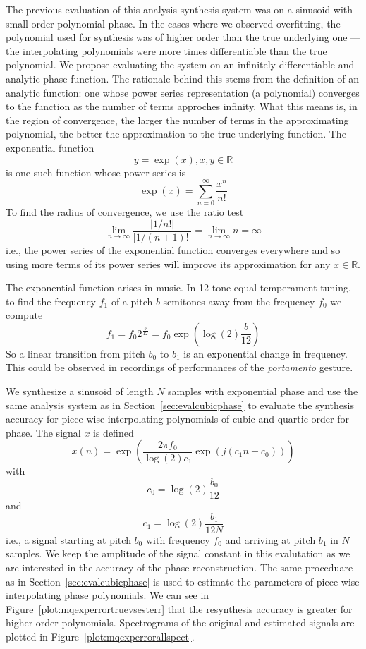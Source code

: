 The previous evaluation of this analysis-synthesis system was on a sinusoid with
small order polynomial phase. In the cases where we observed overfitting, the
polynomial used for synthesis was of higher order than the true underlying one
--- the interpolating polynomials were more times differentiable than the true
polynomial. We propose evaluating the system on an infinitely differentiable and
analytic phase function. The rationale behind this stems from the definition of
an analytic function: one whose power series representation (a polynomial)
converges to the function as the number of terms approches infinity. What this
means is, in the region of convergence, the larger the number of terms in the
approximating polynomial, the better the approximation to the true underlying
function. The exponential function
\[
    y=\exp(x), x,y \in \mathbb{R}
\]
is one such function whose power series is
\[
    \exp(x)=\sum_{n=0}^{\infty} \frac{x^{n}}{n!}
\]
To find the radius of convergence, we use the ratio test
\[
    \lim_{n \rightarrow \infty} \frac{|1/n!|}{|1/(n+1)!|} = \lim_{n \rightarrow \infty} n = \infty
\]
i.e., the power series of the exponential function converges everywhere and so
using more terms of its power series will improve its approximation for
any $x \in \mathbb{R}$.

The exponential function arises in music. In 12-tone equal temperament tuning,
to find the frequency $f_{1}$ of a pitch $b$-semitones away from the frequency
$f_{0}$ we compute
\[
    f_{1}=f_{0}2^{\frac{b}{12}}=f_{0}\exp(\log(2)\frac{b}{12})
\]
So a linear transition from pitch $b_{0}$ to $b_{1}$ is an exponential change in
frequency. This could be observed in recordings of performances of the
\textit{portamento} gesture.

We synthesize a sinusoid  of length $N$ samples with exponential phase and use
the same analysis system as in Section~\ref{sec:evalcubicphase} to evaluate the
synthesis accuracy for piece-wise interpolating polynomials of cubic and quartic
order for phase. The signal $x$ is defined
\[
    x(n) = \exp(\frac{2\pi f_{0}}{\log(2)c_{1}}\exp(j(c_{1}n + c_{0})))
\]
with
\[
    c_{0} = \log(2)\frac{b_{0}}{12}
\]
and
\[
    c_{1}= \log(2)\frac{b_{1}}{12N}
\]
i.e., a signal starting at pitch $b_{0}$ with frequency $f_{0}$ and arriving at
pitch $b_{1}$ in $N$ samples. We keep the amplitude of the signal constant in
this evalutation as we are interested in the accuracy of the phase
reconstruction. The same proceduare as in
Section~\ref{sec:evalcubicphase} is used to estimate the parameters of
piece-wise interpolating phase polynomials. We can see in
Figure~\ref{plot:mqexperrortruevsesterr} that the resynthesis accuracy is
greater for higher order polynomials. Spectrograms of the original and estimated
signals are plotted in Figure~\ref{plot:mqexperrorallspect}.


